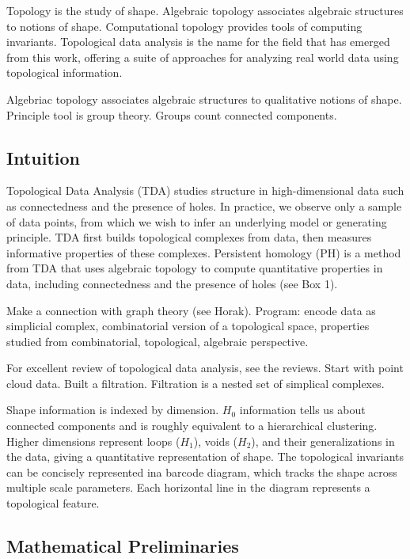 Topology is the study of shape.
Algebraic topology associates algebraic structures to notions of shape.
Computational topology provides tools of computing invariants.
Topological data analysis is the name for the field that has emerged from this work, offering a suite of approaches for analyzing real world data using topological information.

Algebriac topology associates algebraic structures to qualitative notions of shape.
Principle tool is group theory.
Groups count connected components.

\subsection{Intuition}

Topological Data Analysis (TDA) studies structure in high-dimensional data such as connectedness and the presence of holes.
In practice, we observe only a sample of data points, from which we wish to infer an underlying model or generating principle.
TDA first builds topological complexes from data, then measures informative properties of these complexes. 
Persistent homology (PH) is a method from TDA that uses algebraic topology to compute quantitative properties in data, including connectedness and the presence of holes (see Box 1).

Make a connection with graph theory (see Horak). Program: encode data as simplicial complex, combinatorial version of a topological space, properties studied from combinatorial, topological, algebraic perspective.

For excellent review of topological data analysis, see the reviews.
Start with point cloud data.
Built a filtration.
Filtration is a nested set of simplical complexes.

Shape information is indexed by dimension. $H_0$ information tells us about connected components and is roughly equivalent to a hierarchical clustering.
Higher dimensions represent loops ($H_1$), voids ($H_2$), and their generalizations in the data, giving a quantitative representation of shape.
The topological invariants can be concisely represented ina barcode diagram, which tracks the shape across multiple scale parameters.
Each horizontal line in the diagram represents a topological feature.

\subsection{Mathematical Preliminaries}

